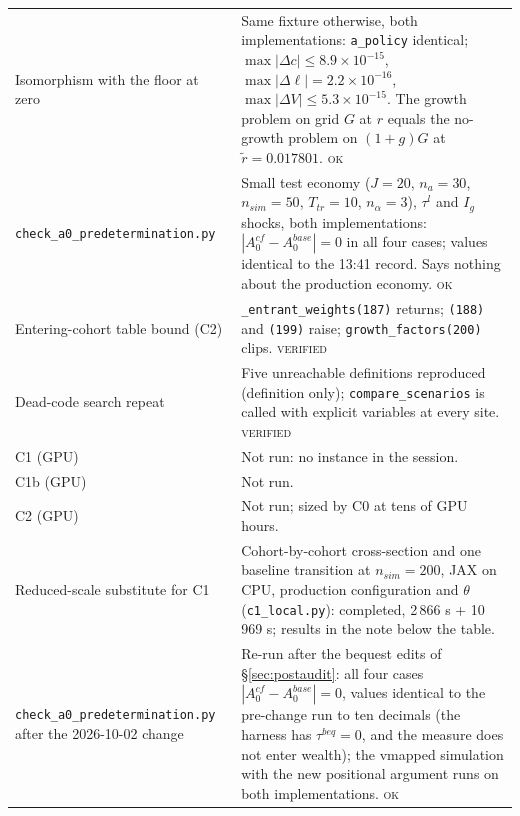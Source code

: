 \documentclass[11pt,a4paper]{article}
\newcommand{\tabdir}{audit_2026-10-01}
\newcommand{\code}[1]{\texttt{#1}}
\newcommand{\verified}{\textsc{verified}}
\newcommand{\ok}{\textsc{ok}}
\begin{document}
\begin{longtable}{@{}p{4.2cm}p{11.3cm}@{}}
Isomorphism with the floor at zero & Same fixture otherwise, both implementations: \code{a_policy} identical; $\max|\Delta c| \le 8.9\times 10^{-15}$, $\max|\Delta \ell| = 2.2\times 10^{-16}$, $\max|\Delta V| \le 5.3\times 10^{-15}$. The growth problem on grid $G$ at $r$ equals the no-growth problem on $(1+g)G$ at $\tilde{r} = 0.017801$. \ok \\
\code{check_a0_predetermination.py} & Small test economy ($J = 20$, $n_a = 30$, $n_{sim} = 50$, $T_{tr} = 10$, $n_\alpha = 3$), $\tau^l$ and $I_g$ shocks, both implementations: $|A_0^{cf} - A_0^{base}| = 0$ in all four cases; values identical to the 13:41 record. Says nothing about the production economy. \ok \\
Entering-cohort table bound (C2) & \code{_entrant_weights(187)} returns; \code{(188)} and \code{(199)} raise; \code{growth_factors(200)} clips. \verified \\
Dead-code search repeat & Five unreachable definitions reproduced (definition only); \code{compare_scenarios} is called with explicit variables at every site. \verified \\
C1 (GPU) & Not run: no instance in the session. \\
C1b (GPU) & Not run. \\
C2 (GPU) & Not run; sized by C0 at tens of GPU hours. \\
Reduced-scale substitute for C1 & Cohort-by-cohort cross-section and one baseline transition at $n_{sim} = 200$, JAX on CPU, production configuration and $\theta$ (\code{c1_local.py}): completed, 2\,866 s + 10\,969 s; results in the note below the table. \\
\code{check_a0_predetermination.py} after the 2026-10-02 change & Re-run after the bequest edits of \S\ref{sec:postaudit}: all four cases $|A_0^{cf} - A_0^{base}| = 0$, values identical to the pre-change run to ten decimals (the harness has $\tau^{beq} = 0$, and the measure does not enter wealth); the vmapped simulation with the new positional argument runs on both implementations. \ok \\
\bottomrule
\end{longtable}


\end{document}
